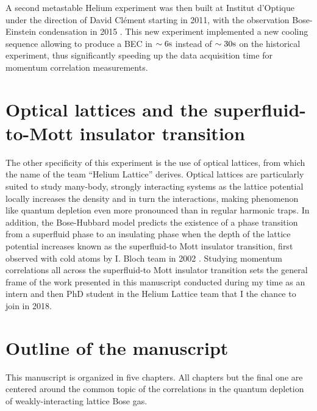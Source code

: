 A second metastable Helium experiment was then built at Institut d'Optique under the direction of David Clément starting in 2011, with the observation Bose-Einstein condensation in 2015 \cite{bouton2015fast}. This new experiment implemented a new cooling sequence allowing to produce a BEC in $\sim 6\rm{s}$ instead of $\sim 30\rm{s}$ on the historical experiment, thus significantly speeding up the data acquisition time for momentum correlation measurements.

\section*{Optical lattices and the superfluid-to-Mott insulator transition}

The other specificity of this experiment is the use of optical lattices, from which the name of the team ``Helium Lattice'' derives. Optical lattices are particularly suited to study many-body, strongly interacting systems as the lattice potential locally increases the density and in turn the interactions, making phenomenon like quantum depletion even more pronounced than in regular harmonic traps. In addition, the Bose-Hubbard model predicts the existence of a phase transition from a superfluid phase to an insulating phase when the depth of the lattice potential increases known as the superfluid-to Mott insulator transition, first observed with cold atoms by I. Bloch team in 2002 \cite{greiner2002quantum}. Studying momentum correlations all across the superfluid-to Mott insulator transition sets the general frame of the work presented in this manuscript conducted during my time as an intern and then PhD student in the Helium Lattice team that I the chance to join in 2018.

\section*{Outline of the manuscript}

This manuscript is organized in five chapters. All chapters but the final one are centered around the common topic of the \kmk correlations in the quantum depletion of weakly-interacting lattice Bose gas.

